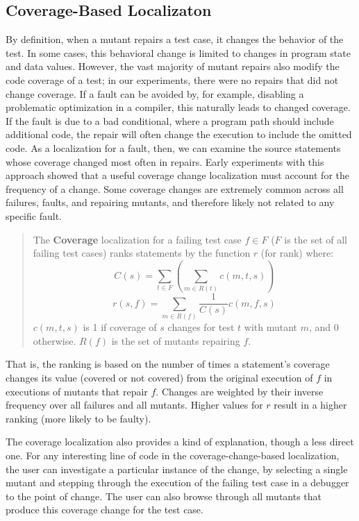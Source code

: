 \subsection{Coverage-Based Localizaton}

By definition, when a mutant repairs a test case, it changes the
behavior of the test.  In some cases, this behavioral change is
limited to changes in program state and data values.  However, the
vast majority of mutant repairs also modify the code coverage of a
test; in our experiments, there were no repairs that did not change
coverage.  If a fault can be avoided by, for example, disabling a
problematic optimization in a compiler, this naturally leads to
changed coverage.  If the fault is due to a bad conditional, where a
program path should include additional code, the repair will often
change the execution to include the omitted code.  As a localization
for a fault, then, we can examine the source statements whose
  coverage changed most often in repairs.  Early experiments with this
  approach showed that a useful coverage change localization must  account for the frequency of a
change.  Some coverage changes are extremely common across all
failures, faults, and repairing mutants,
and therefore likely not related to any specific fault.

\begin{quote}
The {\bf Coverage} localization for a failing test case $f \in F$ ($F$
is the set of all failing test cases) ranks
statements by the function $r$ (for rank) where:
$$C(s) = \sum_{t \in F} (\sum_{m \in R(t)} c(m,t,s))$$
$$r(s,f) = \sum_{m \in R(f)}\frac{1}{C(s)}c(m,f,s)$$
$c(m,t,s)$ is 1 if coverage of $s$ changes for test $t$
with mutant $m$, and 0 otherwise.  $R(f)$ is the set of mutants repairing $f$.
\end{quote}

That is, the ranking is based on the number of times a statement's
coverage changes its value (covered or not covered) from the original
execution of $f$ in executions of mutants that repair $f$.  Changes are weighted by their inverse frequency over all
failures and all mutants.
Higher values for $r$ result in a higher ranking (more likely to
be faulty).  

The coverage localization also provides a kind of explanation, though
a less direct one.  For any
interesting line of code in the coverage-change-based localization,
the user can investigate a particular instance of the change,
by selecting a single mutant and stepping through the execution of the
failing test case in a debugger to the point of change.  The user can also
browse through all mutants that produce this coverage change for the test
case.


